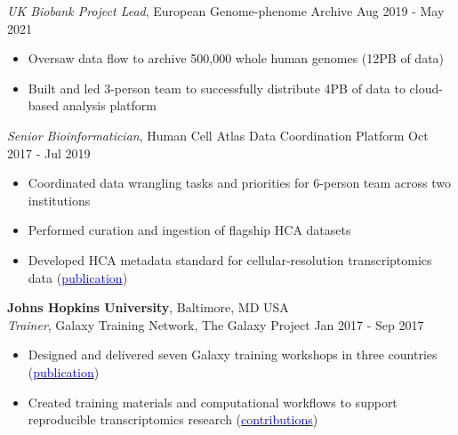 \documentclass[margin,line]{res}
\begin{document}
\begin{resume}
{\em UK Biobank Project Lead}, European Genome-phenome Archive \hfill {Aug 2019 - May 2021}
\begin{itemize}
\itemsep0em 
	\item Oversaw data flow to archive 500,000 whole human genomes (12PB of data)
	\item Built and led 3-person team to successfully distribute 4PB of data to cloud-based analysis platform
\end{itemize}

{\em Senior Bioinformatician}, Human Cell Atlas Data Coordination Platform \hfill {Oct 2017 - Jul 2019}
\begin{itemize}
\itemsep0em 
	\item Coordinated data wrangling tasks and priorities for 6-person team across two institutions
	\item Performed curation and ingestion of flagship HCA datasets
	\item Developed HCA metadata standard for cellular-resolution transcriptomics data (\href{https://doi.org/10.1038/s41587-020-00744-z}{\textcolor{blue}{publication}})
\end{itemize}


{\bf Johns Hopkins University}, Baltimore, MD USA\\
{\em Trainer}, Galaxy Training Network, The Galaxy Project \hfill {Jan 2017 - Sep 2017}
\begin{itemize}
\itemsep0em 
	\item Designed and delivered seven Galaxy training workshops in three countries (\href{https://doi.org/10.1016/j.cels.2018.05.012}{\textcolor{blue}{publication}})
	\item Created training materials and computational workflows to support reproducible transcriptomics research (\href{https://training.galaxyproject.org/training-material/hall-of-fame/malloryfreeberg/}{\textcolor{blue}{contributions}})
\end{itemize}


\end{resume}
\end{document}
